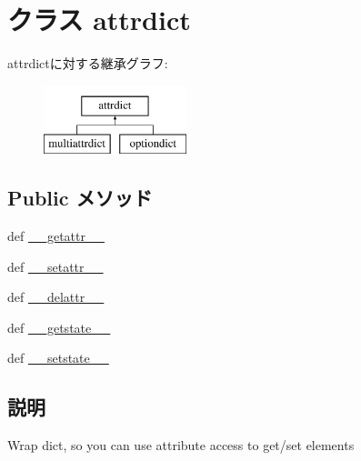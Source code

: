 \hypertarget{classm5_1_1util_1_1attrdict_1_1attrdict}{
\section{クラス attrdict}
\label{classm5_1_1util_1_1attrdict_1_1attrdict}
}
attrdictに対する継承グラフ:\begin{figure}[H]
\begin{center}
\leavevmode
\includegraphics[height=2cm]{classm5_1_1util_1_1attrdict_1_1attrdict}
\end{center}
\end{figure}
\subsection*{Public メソッド}
\begin{DoxyCompactItemize}
\item 
def \hyperlink{classm5_1_1util_1_1attrdict_1_1attrdict_a0a990b3ec3889d40889daca9ee5e4695}{\_\-\_\-getattr\_\-\_\-}
\item 
def \hyperlink{classm5_1_1util_1_1attrdict_1_1attrdict_a6287b7a16286568d5442b6e2e90215b5}{\_\-\_\-setattr\_\-\_\-}
\item 
def \hyperlink{classm5_1_1util_1_1attrdict_1_1attrdict_a83e04d6bd123100dc03d474fd47b2e7a}{\_\-\_\-delattr\_\-\_\-}
\item 
def \hyperlink{classm5_1_1util_1_1attrdict_1_1attrdict_a8a97f085cdc730415d3a782b40a3c31e}{\_\-\_\-getstate\_\-\_\-}
\item 
def \hyperlink{classm5_1_1util_1_1attrdict_1_1attrdict_a2157e3c1b2bcbbc208f96575e0b2029f}{\_\-\_\-setstate\_\-\_\-}
\end{DoxyCompactItemize}


\subsection{説明}
\begin{DoxyVerb}Wrap dict, so you can use attribute access to get/set elements\end{DoxyVerb}
 

